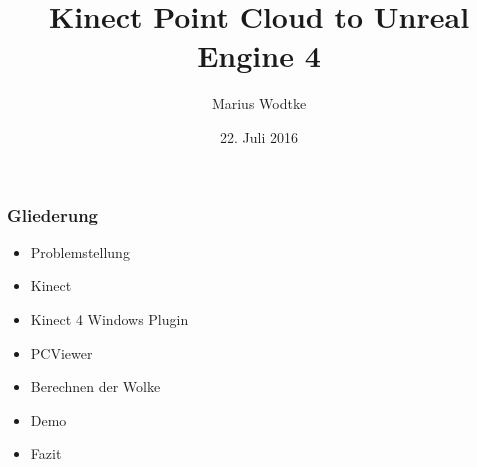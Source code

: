 \documentclass[18pt]{beamer}
\institute{Seminar: Anthropomatik praktisch erfahren}
\title[Kinect Point Cloud to UE4]{Kinect Point Cloud to Unreal Engine 4}
\subtitle{}
\author{Marius Wodtke}
\date{22. Juli 2016}
\begin{document}
\begin{frame}
	\titlepage
\end{frame}

\begin{frame}
    \frametitle{Gliederung}
    \tableofcontents
    \begin{itemize}
    	\item Problemstellung
    	\item Kinect
    	\item Kinect 4 Windows Plugin
    	\item PCViewer
    	\item Berechnen der Wolke
    	\item Demo
    	\item Fazit
    \end{itemize}
\end{frame}
\end{document}
